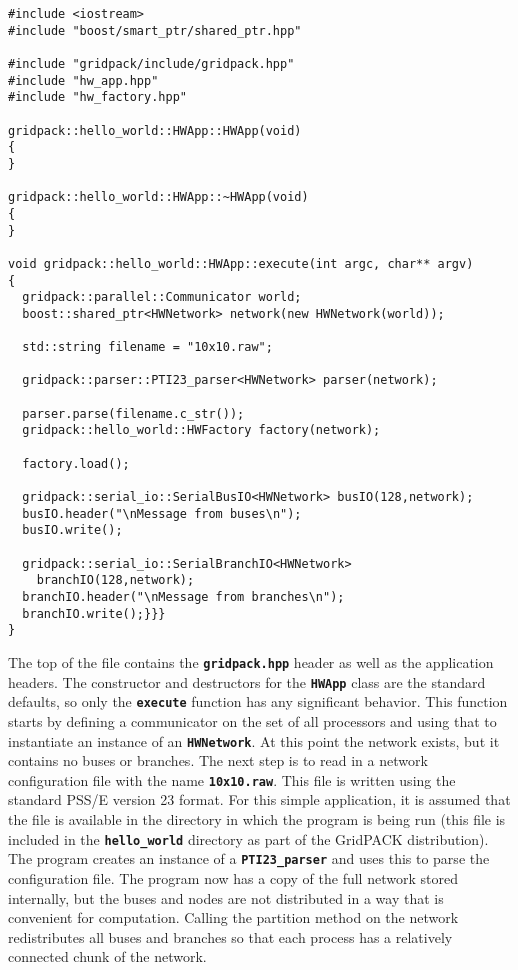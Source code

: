 {
\color{red}
\begin{Verbatim}[fontseries=b]
#include <iostream>
#include "boost/smart_ptr/shared_ptr.hpp"

#include "gridpack/include/gridpack.hpp"
#include "hw_app.hpp"
#include "hw_factory.hpp"

gridpack::hello_world::HWApp::HWApp(void)
{
}

gridpack::hello_world::HWApp::~HWApp(void)
{
}

void gridpack::hello_world::HWApp::execute(int argc, char** argv)
{
  gridpack::parallel::Communicator world;
  boost::shared_ptr<HWNetwork> network(new HWNetwork(world));

  std::string filename = "10x10.raw";

  gridpack::parser::PTI23_parser<HWNetwork> parser(network);

  parser.parse(filename.c_str());
  gridpack::hello_world::HWFactory factory(network);

  factory.load();

  gridpack::serial_io::SerialBusIO<HWNetwork> busIO(128,network);
  busIO.header("\nMessage from buses\n");
  busIO.write();

  gridpack::serial_io::SerialBranchIO<HWNetwork>
    branchIO(128,network);
  branchIO.header("\nMessage from branches\n");
  branchIO.write();}}}
}
\end{Verbatim}
}

The top of the file contains the \texttt{\textbf{gridpack.hpp}} header as well as the application headers. The constructor and destructors for the \texttt{\textbf{HWApp}} class are the standard defaults, so only the \texttt{\textbf{execute}} function has any significant behavior. This function starts by defining a communicator on the set of all processors and using that to instantiate an instance of an \texttt{\textbf{HWNetwork}}. At this point the network exists, but it contains no buses or branches. The next step is to read in a network configuration file with the name \texttt{\textbf{10x10.raw}}. This file is written using the standard PSS/E version 23 format. For this simple application, it is assumed that the file is available in the directory in which the program is being run (this file is included in the \texttt{\textbf{hello\_world}} directory as part of the GridPACK distribution). The program creates an instance of a \texttt{\textbf{PTI23\_parser}} and uses this to parse the configuration file. The program now has a copy of the full network stored internally, but the buses and nodes are not distributed in a way that is convenient for computation. Calling the partition method on the network redistributes all buses and branches so that each process has a relatively connected chunk of the network.

